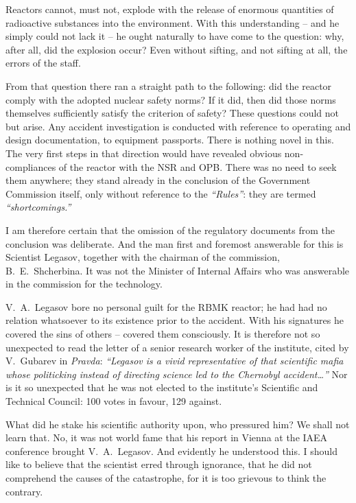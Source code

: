 \documentclass[openright]{bookest}
\begin{document}
Reactors cannot, must not, explode with the release of enormous quantities of radioactive substances into the environment. With this understanding -- and he simply could not lack it -- he ought naturally to have come to the question: why, after all, did the explosion occur? Even without sifting, and not sifting at all, the errors of the staff.

From that question there ran a straight path to the following: did the reactor comply with the adopted nuclear safety norms? If it did, then did those norms themselves sufficiently satisfy the criterion of safety? These questions could not but arise. Any accident investigation is conducted with reference to operating and design documentation, to equipment passports. There is nothing novel in this. The very first steps in that direction would have revealed obvious non-compliances of the reactor with the NSR and OPB. There was no need to seek them anywhere; they stand already in the conclusion of the Government Commission itself, only without reference to the \textit{``Rules''}: they are termed \textit{``shortcomings.''}

I am therefore certain that the omission of the regulatory documents from the conclusion was deliberate. And the man first and foremost answerable for this is Scientist Legasov, together with the chairman of the commission, B.~E.~Shcherbina. It was not the Minister of Internal Affairs who was answerable in the commission for the technology.

V.~A.~Legasov bore no personal guilt for the RBMK reactor; he had had no relation whatsoever to its existence prior to the accident. With his signatures he covered the sins of others -- covered them consciously. It is therefore not so unexpected to read the letter of a senior research worker of the institute, cited by V.~Gubarev in \textit{Pravda}: \textit{``Legasov is a vivid representative of that scientific mafia whose politicking instead of directing science led to the Chernobyl accident\ldots''} Nor is it so unexpected that he was not elected to the institute's Scientific and Technical Council: \num{100} votes in favour, \num{129} against.

What did he stake his scientific authority upon, who pressured him? We shall not learn that. No, it was not world fame that his report in Vienna at the IAEA conference brought V.~A.~Legasov. And evidently he understood this. I should like to believe that the scientist erred through ignorance, that he did not comprehend the causes of the catastrophe, for it is too grievous to think the contrary.
\end{document}
